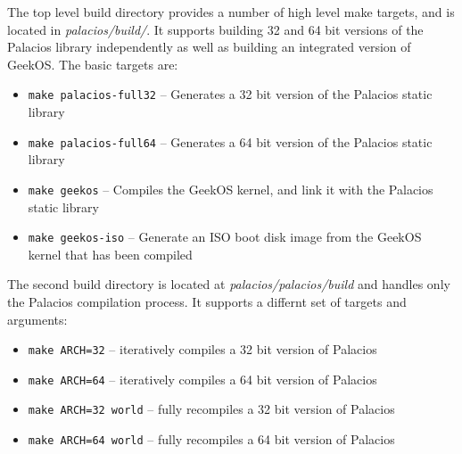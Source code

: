 \documentclass[11pt]{article}
\begin{document}
The top level build directory provides a number of high level make
targets, and is located in {\em palacios/build/}. It supports building
32 and 64 bit versions of the Palacios library independently as well
as building an integrated version of GeekOS.   The basic targets are:
\begin{itemize}
\item \verb.make palacios-full32. -- Generates a 32 bit version of the Palacios static library 
\item \verb.make palacios-full64. -- Generates a 64 bit version of the
Palacios static library
\item \verb.make geekos. -- Compiles the GeekOS kernel, and link it with the
Palacios static library 
\item \verb.make geekos-iso. -- Generate an ISO boot disk image from the
GeekOS kernel that has been compiled
\end{itemize}

The second build directory is located at {\em palacios/palacios/build}
and handles only the Palacios compilation process. It supports a
differnt set of targets and arguments:
\begin{itemize}
\item \verb.make ARCH=32. -- iteratively compiles a 32 bit version of Palacios
\item \verb.make ARCH=64. -- iteratively compiles a 64 bit version of
Palacios
\item \verb.make ARCH=32 world. -- fully recompiles a 32 bit version of
Palacios
\item \verb.make ARCH=64 world. -- fully recompiles a 64 bit version of
Palacios
\end{itemize}
\end{document}
